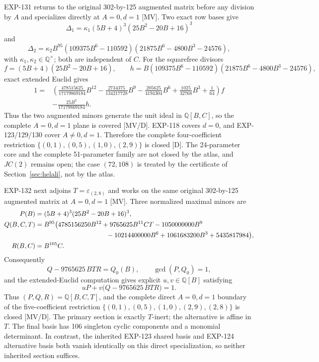 \documentclass[11pt]{article}
\theoremstyle{remark}
\newcommand{\Q}{\mathbb{Q}}
\begin{document}
EXP-131 returns to the original 302-by-125 augmented matrix before any
division by \(A\) and specializes directly at \(A=0,d=1\) [MV]. Two exact
row bases give
\[
 \Delta_1=\kappa_1(5B+4)^3(25B^2-20B+16)^3
\]
and
\[
 \Delta_2=\kappa_2 B^{95}(109375B^6-110592)
 (21875B^6-4800B^3-24576),
\]
with \(\kappa_1,\kappa_2\in\Q^\times\); both are independent of \(C\).
For the squarefree divisors
\[
 f=(5B+4)(25B^2-20B+16),\qquad
 h=B(109375B^6-110592)(21875B^6-4800B^3-24576),
\]
exact extended Euclid gives
\[
\begin{aligned}
1={}&\left(
\frac{478515625}{17179869184}B^{12}
-\frac{2734375}{134217728}B^9
-\frac{205625}{4194304}B^6
+\frac{1025}{32768}B^3+\frac1{64}
\right)f\\
&-\frac{25B^2}{17179869184}h.
\end{aligned}
\]
Thus the two augmented minors generate the unit ideal in \(\Q[B,C]\), so
the complete \(A=0,d=1\) plane is covered [MV/D]. EXP-118 covers \(d=0\),
and EXP-123/129/130 cover \(A\ne0,d=1\). Therefore the complete
four-coefficient restriction
\(\{(0,1),(0,5),(1,0),(2,9)\}\) is closed [D]. The 24-parameter core and the
complete 51-parameter family are not closed by the atlas, and \(JC(2)\) remains open;
the case \((72,108)\) is treated by the certificate of Section~\ref{sec:helali}, not by the atlas.

EXP-132 next adjoins \(T=\varepsilon_{(2,8)}\) and works on the same original
302-by-125 augmented matrix at \(A=0,d=1\) [MV]. Three normalized maximal
minors are
\[
\begin{aligned}
P(B)&=(5B+4)^3(25B^2-20B+16)^3,\\
Q(B,C,T)&=B^{95}\bigl(4785156250B^{12}+9765625B^{11}CT
 -1050000000B^9\\
&\hspace{38mm}{}-10214400000B^6+1061683200B^3+5435817984\bigr),\\
R(B,C)&=B^{105}C.
\end{aligned}
\]
Consequently
\[
 Q-9765625\,BTR=Q_0(B),\qquad \gcd(P,Q_0)=1,
\]
and the extended-Euclid computation gives explicit
\(u,v\in\Q[B]\) satisfying
\[
 uP+v\bigl(Q-9765625\,BTR\bigr)=1.
\]
Thus \((P,Q,R)=\Q[B,C,T]\), and the complete direct \(A=0,d=1\)
boundary of the five-coefficient restriction
\(\{(0,1),(0,5),(1,0),(2,9),(2,8)\}\) is closed [MV/D]. The primary
section is exactly \(T\)-inert; the alternative is affine in \(T\). The
final basis has 106 singleton cyclic components and a monomial
determinant. In contrast, the inherited EXP-123 shared basis and EXP-124
alternative basis both vanish identically on this direct specialization,
so neither inherited section suffices.
\end{document}
